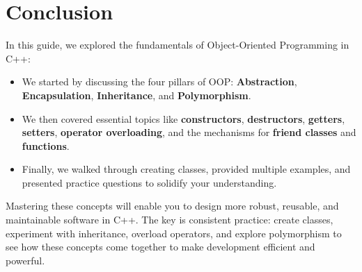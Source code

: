 \documentclass[a4paper,12pt]{article}
\begin{document}
\section{Conclusion}
In this guide, we explored the fundamentals of Object-Oriented Programming in C++:
\begin{itemize}
    \item We started by discussing the four pillars of OOP: \textbf{Abstraction}, \textbf{Encapsulation}, \textbf{Inheritance}, and \textbf{Polymorphism}.
    \item We then covered essential topics like \textbf{constructors}, \textbf{destructors}, \textbf{getters}, \textbf{setters}, \textbf{operator overloading}, and the mechanisms for \textbf{friend classes} and \textbf{functions}.
    \item Finally, we walked through creating classes, provided multiple examples, and presented practice questions to solidify your understanding.
\end{itemize}

Mastering these concepts will enable you to design more robust, reusable, and maintainable software in C++. The key is consistent practice: create classes, experiment with inheritance, overload operators, and explore polymorphism to see how these concepts come together to make development efficient and powerful.
\end{document}
